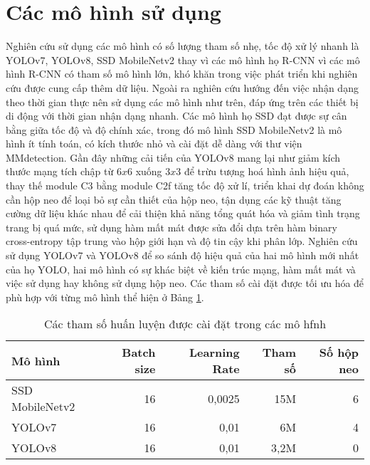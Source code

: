 \documentclass[../the.tex]{subfiles}
\begin{document}
\section{Các mô hình sử dụng}
\label{sec:model}


{\fontsize{13}{12} \selectfont

	Nghiên cứu sử dụng các mô hình có số lượng tham số nhẹ, tốc độ xử lý nhanh là YOLOv7, YOLOv8, SSD MobileNetv2 thay vì các mô hình họ R-CNN vì các mô hình R-CNN có tham số mô hình lớn, khó khăn trong việc phát triển khi nghiên cứu được cung cấp thêm dữ liệu.
	Ngoài ra nghiên cứu hướng đến việc nhận dạng theo thời gian thực nên sử dụng các mô hình như trên, đáp ứng trên các thiết bị di động với thời gian nhận dạng nhanh.
	Các mô hình họ SSD đạt được sự cân bằng giữa tốc độ và độ chính xác, trong đó mô hình
	SSD MobileNetv2 là mô hình ít tính toán, có kích thước nhỏ và cài đặt dễ dàng với thư viện MMdetection.
	Gần đây những cải tiến của YOLOv8 mang lại như giảm kích thước mạng tích chập từ $6x6$ xuống $3x3$ để trừu tượng hoá hình ảnh hiệu quả, thay thế module C3 bằng module C2f tăng tốc độ xử lí, triển khai dự đoán không cần hộp neo để loại bỏ sự cần thiết của hộp neo,
	tận dụng các kỹ thuật tăng cường dữ liệu khác nhau để cải thiện khả năng tổng quát hóa và giảm tình trạng trang bị quá mức, sử dụng hàm mất mát được sửa đổi dựa trên hàm binary cross-entropy tập trung vào hộp giới hạn và độ tin cậy khi phân lớp.
	Nghiên cứu sử dụng YOLOv7 và YOLOv8 để so sánh độ hiệu quả của hai mô hình mới nhất của họ YOLO, hai mô hình có sự khác biệt về kiến trúc mạng, hàm mất mát và việc sử dụng hay không sử dụng hộp neo.
	Các tham số cài đặt được tối ưu hóa để phù hợp với từng mô hình thể hiện ở Bảng \ref{tab:caidat}.

}


\begin{table}[H]
	\centering
	\begin{threeparttable}
		\caption{Các tham số huấn luyện được cài đặt trong các mô hfnh}

		\begin{tabular}{lrrrr}
			\hline
			\textbf{Mô hình} & \textbf{Batch size} & \textbf{Learning Rate} & \textbf{Tham số} & \textbf{Số hộp neo} \\ \hline
			SSD MobileNetv2    & 16                  & 0,0025                  & 15M              & 6                   \\ \hline
			YOLOv7           & 16                  & 0,01                   & 6M               & 4                   \\ \hline
			YOLOv8           & 16                  & 0,01                   & 3,2M             & 0                   \\ \hline
		\end{tabular}
		\label{tab:caidat}
	\end{threeparttable}
\end{table}
\end{document}
